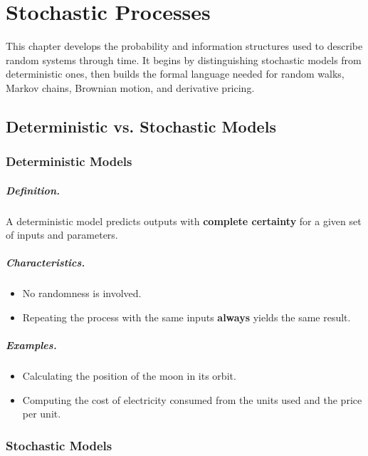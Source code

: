 \documentclass[12pt,openany]{book}
\theoremstyle{definition}
\theoremstyle{remark}
\begin{document}
\chapter{Stochastic Processes}

This chapter develops the probability and information structures used to
describe random systems through time. It begins by distinguishing stochastic
models from deterministic ones, then builds the formal language needed for
random walks, Markov chains, Brownian motion, and derivative pricing.

\section{Deterministic vs. Stochastic Models}

\subsection{Deterministic Models}

\paragraph{Definition.}
A deterministic model predicts outputs with \textbf{complete certainty} for a
given set of inputs and parameters.

\paragraph{Characteristics.}
\begin{itemize}
    \item No randomness is involved.
    \item Repeating the process with the same inputs \textbf{always} yields
    the same result.
\end{itemize}

\paragraph{Examples.}
\begin{itemize}
    \item Calculating the position of the moon in its orbit.
    \item Computing the cost of electricity consumed from the units used and
    the price per unit.
\end{itemize}

\subsection{Stochastic Models}
\end{document}
